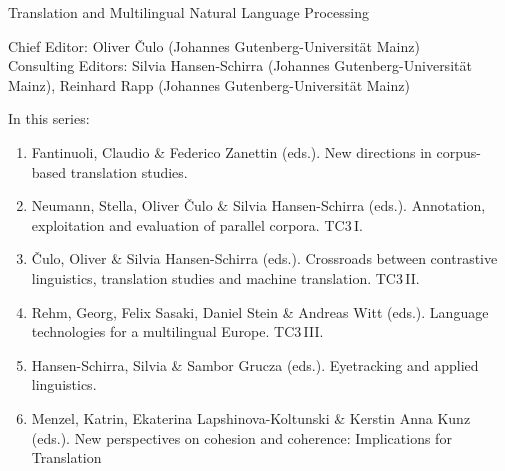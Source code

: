 {\large Translation and Multilingual Natural Language Processing}

\bigskip

Chief Editor: Oliver \v{C}ulo (Johannes Gutenberg-Universität Mainz) \\
Consulting Editors: Silvia Hansen-Schirra (Johannes Gutenberg-Universität Mainz), 
Reinhard Rapp (Johannes Gutenberg-Universität Mainz)

\bigskip

In this series:

\begin{enumerate}
\item Fantinuoli, Claudio \& Federico Zanettin (eds.). New directions in corpus-based translation studies.
\item Neumann, Stella, Oliver Čulo \& Silvia Hansen-Schirra (eds.). Annotation, exploitation and evaluation of parallel corpora. TC3\,I.
\item Čulo, Oliver  \& Silvia Hansen-Schirra (eds.). Crossroads between contrastive linguistics, translation studies and machine translation. TC3\,II.
\item Rehm, Georg, Felix Sasaki, Daniel Stein \& Andreas Witt (eds.). Language technologies for a multilingual Europe. TC3\,III.
\item Hansen-Schirra, Silvia \& Sambor Grucza (eds.). Eyetracking and applied linguistics.
\item Menzel, Katrin, Ekaterina Lapshinova-Koltunski \& Kerstin Anna Kunz  (eds.). New perspectives on cohesion and coherence: Implications for Translation
\end{enumerate}

 
